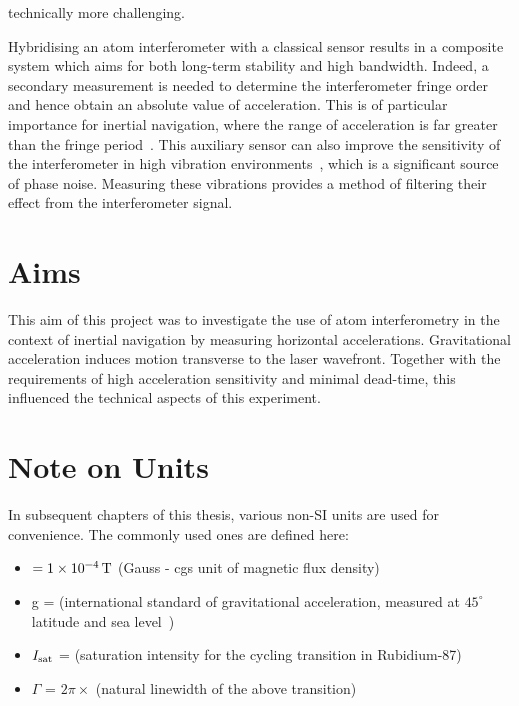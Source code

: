 technically more challenging. 
\par\noindent
Hybridising an atom interferometer with a classical
sensor results in a composite system which aims for both long-term
stability and high bandwidth. Indeed, a secondary
measurement is needed to determine the interferometer fringe order and hence obtain
an absolute value of acceleration. This is of particular importance
for inertial navigation, where the range of acceleration is far
greater than the fringe period~\cite{Merlet2009}. This auxiliary sensor can also
improve the sensitivity of the interferometer in high vibration
environments~\cite{Lautier2014}, which is a significant source of phase
noise. Measuring these vibrations provides a method of filtering their
effect from the interferometer signal. 
\nocite{Dimopoulos2008}
\section{Aims}
This aim of this project was to investigate the use of atom
interferometry in the context of inertial navigation by measuring
horizontal accelerations. Gravitational acceleration induces motion
transverse to the laser wavefront. Together with the requirements of
high acceleration sensitivity and minimal dead-time, this influenced the technical
aspects of this experiment.  
\section{Note on Units}

In subsequent chapters of this thesis, various non-SI units are used
for convenience. The commonly used ones are defined here:
\begin{itemize}
  \item {} \(= \sivalue{1e-4}{\tesla}\) (Gauss - cgs
    unit of magnetic flux density)
    \item g = 
      (international standard of gravitational acceleration, measured
      at $45^\circ$ latitude and sea level~\cite{accelStandard})
    \item $I_\textnormal{sat}$ = 
      (saturation intensity for the  cycling transition in
      Rubidium-87)
    \item $\Gamma$ = $2\pi \times$  (natural
      linewidth of the above transition)
  \end{itemize}
